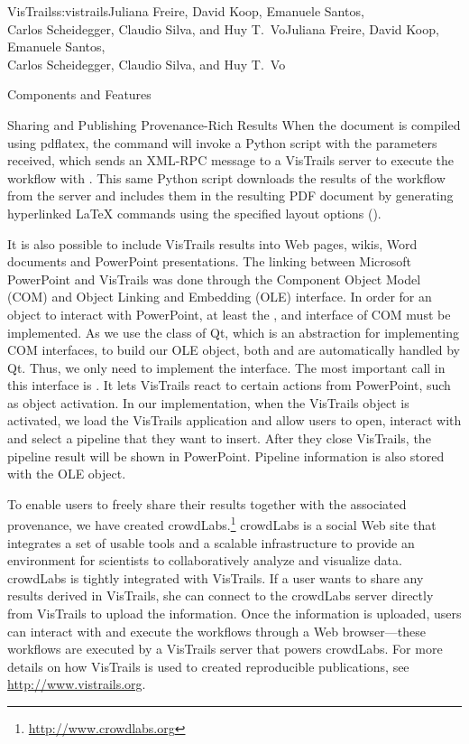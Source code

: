 \begin{aosachaptertoc}{VisTrails}{s:vistrails}{Juliana Freire, David Koop, Emanuele Santos, \\ Carlos Scheidegger, Claudio Silva, and Huy T.\ Vo}{Juliana Freire, David Koop, Emanuele Santos, \\ \hspace*{0.9cm} Carlos Scheidegger, Claudio Silva, and Huy T.\ Vo}
\begin{aosasect1}{Components and Features}
\begin{aosasect2}{Sharing and Publishing Provenance-Rich Results}
When the document is compiled using pdflatex, the
 command will invoke a Python script
with the parameters received, which sends an XML-RPC message to a
VisTrails server to execute the workflow with . This same
Python script downloads the results of the workflow from the server
and includes them in the resulting PDF document by generating
hyperlinked LaTeX  commands
using the specified layout options
().

It is also possible to include VisTrails results into Web pages,
wikis, Word documents and PowerPoint presentations. The linking
between Microsoft PowerPoint and VisTrails was done through the
Component Object Model (COM) and Object Linking and Embedding (OLE)
interface. In order for an object to interact with PowerPoint, at
least the ,  and
 interface of COM must be implemented. As we use
the  class of Qt, which is an abstraction for
implementing COM interfaces, to build our OLE object, both
 and  are automatically
handled by Qt. Thus, we only need to implement the 
interface. The most important call in this interface is
. It lets VisTrails react to certain actions from
PowerPoint, such as object activation. In our implementation, when the
VisTrails object is activated, we load the VisTrails application and
allow users to open, interact with and select a pipeline that they
want to insert. After they close VisTrails, the pipeline result will
be shown in PowerPoint. Pipeline information is also stored with the
OLE object.

To enable users to freely share their results together with the
associated provenance, we have created
crowdLabs.\footnote{\url{http://www.crowdlabs.org}} crowdLabs is a
social Web site that integrates a set of usable tools and a scalable
infrastructure to provide an environment for scientists to
collaboratively analyze and visualize data.  crowdLabs is tightly
integrated with VisTrails. If a user wants to share any results
derived in VisTrails, she can connect to the crowdLabs server directly
from VisTrails to upload the information. Once the information is
uploaded, users can interact with and execute the workflows through a
Web browser---these workflows are executed by a VisTrails server that
powers crowdLabs. For more details on how VisTrails is used to created reproducible publications, see \url{http://www.vistrails.org}.


\end{aosasect2}
\end{aosasect1}
\end{aosachaptertoc}
